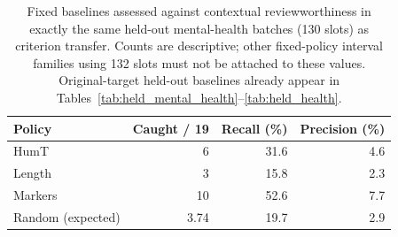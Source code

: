 \begin{table}[htbp]
\centering\small
\caption{Fixed baselines assessed against contextual reviewworthiness in exactly the same held-out mental-health batches (130 slots) as criterion transfer. Counts are descriptive; other fixed-policy interval families using 132 slots must not be attached to these values. Original-target held-out baselines already appear in Tables~\ref{tab:held_mental_health}--\ref{tab:held_health}.}
\label{tab:transferbaselines}
\begin{tabular}{lrrr}
\toprule
Policy & Caught / 19 & Recall (\%) & Precision (\%) \\
\midrule
HumT & 6 & 31.6 & 4.6 \\
Length & 3 & 15.8 & 2.3 \\
Markers & 10 & 52.6 & 7.7 \\
Random (expected) & 3.74 & 19.7 & 2.9 \\
\bottomrule
\end{tabular}
\end{table}
